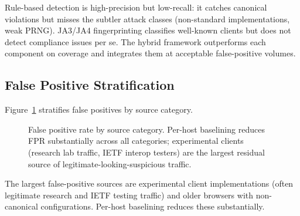 \documentclass[sigconf,nonacm]{acmart}
\begin{document}
Rule-based detection is high-precision but low-recall: it catches
canonical violations but misses the subtler attack classes
(non-standard implementations, weak PRNG). JA3/JA4 fingerprinting
classifies well-known clients but does not detect compliance
issues per se. The hybrid framework outperforms each component
on coverage and integrates them at acceptable false-positive
volumes.

\subsection{False Positive Stratification}

Figure~\ref{fig:fpr} stratifies false positives by source category.

\begin{figure}[h]
\centering
{}
\caption{False positive rate by source category. Per-host
  baselining reduces FPR substantially across all categories;
  experimental clients (research lab traffic, IETF interop testers)
  are the largest residual source of legitimate-looking-suspicious
  traffic.}
\label{fig:fpr}
\end{figure}

The largest false-positive sources are experimental client
implementations (often legitimate research and IETF testing
traffic) and older browsers with non-canonical configurations.
Per-host baselining reduces these substantially.
\end{document}
